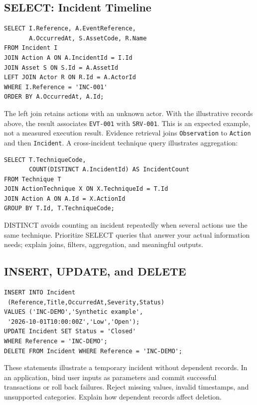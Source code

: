 \documentclass[sigconf]{acmart}
\newcommand{\guidance}[1]{{\color{blue}#1}}
\begin{document}
\subsection{SELECT: Incident Timeline}
\par\noindent\begin{minipage}{\columnwidth}
\begin{lstlisting}
SELECT I.Reference, A.EventReference,
       A.OccurredAt, S.AssetCode, R.Name
FROM Incident I
JOIN Action A ON A.IncidentId = I.Id
JOIN Asset S ON S.Id = A.AssetId
LEFT JOIN Actor R ON R.Id = A.ActorId
WHERE I.Reference = 'INC-001'
ORDER BY A.OccurredAt, A.Id;
\end{lstlisting}
\end{minipage}\par
The left join retains actions with an unknown actor. With the illustrative
records above, the result associates \texttt{EVT-001} with \texttt{SRV-001}.
This is an expected example, not a measured execution result.
Evidence retrieval joins \texttt{Observation} to \texttt{Action} and then
\texttt{Incident}. A cross-incident technique query illustrates aggregation:
\par\noindent\begin{minipage}{\columnwidth}
\begin{lstlisting}
SELECT T.TechniqueCode,
       COUNT(DISTINCT A.IncidentId) AS IncidentCount
FROM Technique T
JOIN ActionTechnique X ON X.TechniqueId = T.Id
JOIN Action A ON A.Id = X.ActionId
GROUP BY T.Id, T.TechniqueCode;
\end{lstlisting}
\end{minipage}\par
DISTINCT avoids counting an incident repeatedly when several actions use the
same technique. \guidance{Prioritize SELECT queries that answer your actual
information needs; explain joins, filters, aggregation, and meaningful outputs.}

\subsection{INSERT, UPDATE, and DELETE}
\par\noindent\begin{minipage}{\columnwidth}
\begin{lstlisting}
INSERT INTO Incident
 (Reference,Title,OccurredAt,Severity,Status)
VALUES ('INC-DEMO','Synthetic example',
 '2026-10-01T10:00:00Z','Low','Open');
UPDATE Incident SET Status = 'Closed'
WHERE Reference = 'INC-DEMO';
DELETE FROM Incident WHERE Reference = 'INC-DEMO';
\end{lstlisting}
\end{minipage}\par
These statements illustrate a temporary incident without dependent records.
In an application, bind user inputs as parameters and commit successful
transactions or roll back failures. Reject missing values, invalid timestamps,
and unsupported categories. Explain how dependent records affect deletion.
\end{document}
